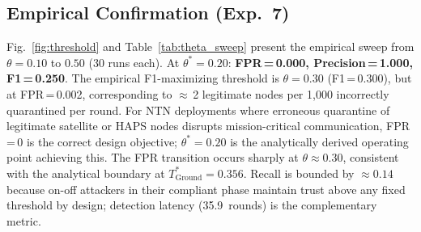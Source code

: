 \documentclass[journal,twoside,10pt]{IEEEtran}
\begin{document}
\subsection{Empirical Confirmation (Exp.~7)}

Fig.~\ref{fig:threshold} and Table~\ref{tab:theta_sweep} present the
empirical sweep from $\theta\!=\!0.10$ to $0.50$ (30 runs each).
At $\theta^*\!=\!0.20$: \textbf{FPR\,=\,0.000, Precision\,=\,1.000,
F1\,=\,0.250}.
The empirical F1-maximizing threshold is $\theta\!=\!0.30$
(F1\,=\,0.300), but at FPR\,=\,0.002, corresponding to
$\approx$\,2 legitimate nodes per 1{,}000 incorrectly quarantined
per round.
For NTN deployments where erroneous quarantine of legitimate satellite
or HAPS nodes disrupts mission-critical communication,
FPR\,=\,0 is the correct design objective; $\theta^*\!=\!0.20$ is
the analytically derived operating point achieving this.
The FPR transition occurs sharply at $\theta\!\approx\!0.30$,
consistent with the analytical boundary at $T^*_{\mathrm{Ground}}\!=\!0.356$.
Recall is bounded by $\approx\!0.14$ because on-off attackers in
their compliant phase maintain trust above any fixed threshold by
design; detection latency (35.9~rounds) is the complementary metric.
\end{document}

